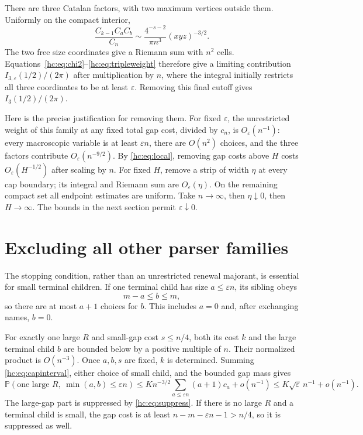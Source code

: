 \documentclass[11pt,a4paper]{article}
\theoremstyle{definition}\newaliascnt{definition}{theorem}
\theoremstyle{remark}\newaliascnt{remark}{theorem}
\newcommand{\ljP}{\mathbb P}
\begin{document}
There are three Catalan factors, with two maximum vertices outside them.
Uniformly on the compact interior,
\begin{equation}\label{hc:eq:tripleweight}
 \frac{C_{k-1}C_aC_b}{C_n}
 \sim\frac{4^{-s-2}}{\pi n^3}(xyz)^{-3/2}.
\end{equation}
The two free size coordinates give a Riemann sum with $n^2$ cells.
Equations~\eqref{hc:eq:chi2}--\eqref{hc:eq:tripleweight} therefore give a
limiting contribution $I_{3,\varepsilon}(1/2)/(2\pi)$ after multiplication by
$n$, where the integral initially restricts all three coordinates to be at
least $\varepsilon$. Removing this final cutoff gives $I_3(1/2)/(2\pi)$.

Here is the precise justification for removing them. For fixed
$\varepsilon$, the unrestricted weight of this family at any fixed total gap
cost, divided by $c_n$, is $O_\varepsilon(n^{-1})$: every macroscopic
variable is at least $\varepsilon n$, there are $O(n^2)$ choices, and the
three factors contribute $O_\varepsilon(n^{-9/2})$. By \eqref{hc:eq:local},
removing gap costs above $H$ costs $O_\varepsilon(H^{-1/2})$ after scaling by
$n$. For fixed $H$, remove a strip of width $\eta$ at every cap boundary; its
integral and Riemann sum are $O_\varepsilon(\eta)$. On the remaining compact
set all endpoint estimates are uniform. Take $n\to\infty$, then
$\eta\downarrow0$, then $H\to\infty$. The bounds in the next section permit
$\varepsilon\downarrow0$.

\section{Excluding all other parser families}\label{hc:sec:remainders}
The stopping condition, rather than an unrestricted renewal majorant, is
essential for small terminal children. If one terminal child has size
$a\le\varepsilon n$, its sibling obeys
\begin{equation}\label{hc:eq:capinterval}
 m-a\le b\le m,
\end{equation}
so there are at most $a+1$ choices for $b$. This includes $a=0$ and, after
exchanging names, $b=0$.

For exactly one large $R$ and small-gap cost $s\le n/4$, both its cost $k$
and the large terminal child $b$ are bounded below by a positive multiple of
$n$. Their normalized product is $O(n^{-3})$. Once $a,b,s$ are fixed, $k$ is
determined. Summing \eqref{hc:eq:capinterval}, either choice of small child,
and the bounded gap mass gives
\begin{equation}\label{hc:eq:corner}
 \ljP(\text{one large }R,\ \min(a,b)\le\varepsilon n)
 \le K n^{-3/2}\sum_{a\le\varepsilon n}(a+1)c_a+o(n^{-1})
 \le K\sqrt\varepsilon\,n^{-1}+o(n^{-1}).
\end{equation}
The large-gap part is suppressed by \eqref{hc:eq:suppress}. If there is no
large $R$ and a terminal child is small, the gap cost is at least
$n-m-\varepsilon n-1>n/4$, so it is suppressed as well.
\end{document}
